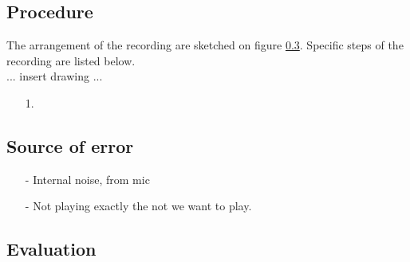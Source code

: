 \subsection{Procedure}
The arrangement of the recording are sketched on figure \ref{}. Specific steps of the recording are listed below. \\

... insert drawing ... \\
\begin{itemize}
\item[1.] 
\end{itemize}
 



\subsection{Source of error}
\begin{itemize}
\item[-] Internal noise, from mic 
\item[-]	 Not playing exactly the not we want to play. 
\end{itemize}

\subsection{Evaluation}
 


